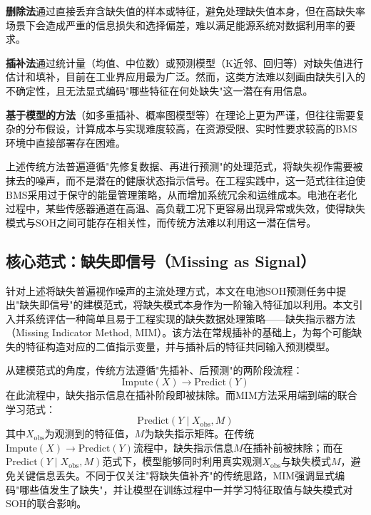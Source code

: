 \documentclass[10pt,a4paper]{ctexart}
\begin{document}
\textbf{删除法}通过直接丢弃含缺失值的样本或特征，避免处理缺失值本身，但在高缺失率场景下会造成严重的信息损失和选择偏差，难以满足能源系统对数据利用率的要求。

\textbf{插补法}通过统计量（均值、中位数）或预测模型（K近邻、回归等）对缺失值进行估计和填补，目前在工业界应用最为广泛。然而，这类方法难以刻画由缺失引入的不确定性，且无法显式编码"哪些特征在何处缺失"这一潜在有用信息。

\textbf{基于模型的方法}（如多重插补、概率图模型等）在理论上更为严谨，但往往需要复杂的分布假设，计算成本与实现难度较高，在资源受限、实时性要求较高的BMS环境中直接部署存在困难。

上述传统方法普遍遵循"先修复数据、再进行预测"的处理范式，将缺失视作需要被抹去的噪声，而不是潜在的健康状态指示信号。在工程实践中，这一范式往往迫使BMS采用过于保守的能量管理策略，从而增加系统冗余和运维成本。电池在老化过程中，某些传感器通道在高温、高负载工况下更容易出现异常或失效，使得缺失模式与SOH之间可能存在相关性，而传统方法难以利用这一潜在信号。

\subsection{核心范式：缺失即信号（Missing as Signal）}

针对上述将缺失普遍视作噪声的主流处理方式，本文在电池SOH预测任务中提出"缺失即信号"的建模范式，将缺失模式本身作为一阶输入特征加以利用。本文引入并系统评估一种简单且易于工程实现的缺失数据处理策略——缺失指示器方法（Missing Indicator Method, MIM）\cite{jones1996indicator,van2023missing}。该方法在常规插补的基础上，为每个可能缺失的特征构造对应的二值指示变量，并与插补后的特征共同输入预测模型。

从建模范式的角度，传统方法遵循"先插补、后预测"的两阶段流程：
\begin{equation}
    \text{Impute}(X) \rightarrow \text{Predict}(Y)
\end{equation}
在此流程中，缺失指示信息在插补阶段即被抹除。而MIM方法采用端到端的联合学习范式：
\begin{equation}
    \text{Predict}(Y \mid X_{\mathrm{obs}}, M)
\end{equation}
其中$X_{\mathrm{obs}}$为观测到的特征值，$M$为缺失指示矩阵。在传统$\text{Impute}(X)\rightarrow\text{Predict}(Y)$流程中，缺失指示信息$M$在插补前被抹除；而在$\text{Predict}(Y \mid X_{\mathrm{obs}}, M)$范式下，模型能够同时利用真实观测$X_{\mathrm{obs}}$与缺失模式$M$，避免关键信息丢失。不同于仅关注"将缺失值补齐"的传统思路，MIM强调显式编码"哪些值发生了缺失"，并让模型在训练过程中一并学习特征取值与缺失模式对SOH的联合影响。
\end{document}
